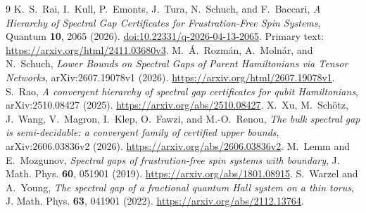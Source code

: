 \documentclass{article}
\begin{document}
\begin{thebibliography}{9}
K.~S.~Rai, I.~Kull, P.~Emonts, J.~Tura, N.~Schuch, and F.~Baccari,
\emph{A Hierarchy of Spectral Gap Certificates for Frustration-Free Spin Systems},
Quantum \textbf{10}, 2065 (2026).
\href{https://doi.org/10.22331/q-2026-04-13-2065}{doi:10.22331/q-2026-04-13-2065}.
Primary text: \url{https://arxiv.org/html/2411.03680v3}.
M.~\'A.~Rozm\'an, A.~Moln\'ar, and N.~Schuch,
\emph{Lower Bounds on Spectral Gaps of Parent Hamiltonians via Tensor Networks},
arXiv:2607.19078v1 (2026).
\url{https://arxiv.org/html/2607.19078v1}.
S.~Rao, \emph{A convergent hierarchy of spectral gap certificates for qubit
Hamiltonians}, arXiv:2510.08427 (2025).
\url{https://arxiv.org/abs/2510.08427}.
X.~Xu, M.~Sch\"otz, J.~Wang, V.~Magron, I.~Klep, O.~Fawzi, and
M.-O.~Renou, \emph{The bulk spectral gap is semi-decidable: a convergent
family of certified upper bounds}, arXiv:2606.03836v2 (2026).
\url{https://arxiv.org/abs/2606.03836v2}.
M.~Lemm and E.~Mozgunov, \emph{Spectral gaps of frustration-free spin systems
with boundary}, J. Math. Phys. \textbf{60}, 051901 (2019).
\url{https://arxiv.org/abs/1801.08915}.
S.~Warzel and A.~Young, \emph{The spectral gap of a fractional quantum
Hall system on a thin torus}, J. Math. Phys. \textbf{63},
041901 (2022). \url{https://arxiv.org/abs/2112.13764}.
\end{thebibliography}
\end{document}
